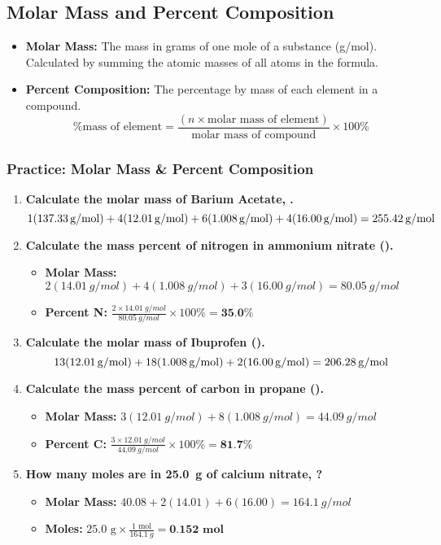 \documentclass{article}
\begin{document}
\subsection*{Molar Mass and Percent Composition}
\begin{itemize}[itemsep=5pt]
    \item \textbf{Molar Mass:} The mass in grams of one mole of a substance (\si{g/mol}). Calculated by summing the atomic masses of all atoms in the formula.
    \item \textbf{Percent Composition:} The percentage by mass of each element in a compound.
    \[ \text{\% mass of element} = \frac{(n \times \text{molar mass of element})}{\text{molar mass of compound}} \times 100\% \]
\end{itemize}

\subsubsection*{Practice: Molar Mass \& Percent Composition}
\begin{enumerate}[itemsep=5pt]
    \item \textbf{Calculate the molar mass of Barium Acetate, .}
    \[ 1(\SI{137.33}{g/mol}) + 4(\SI{12.01}{g/mol}) + 6(\SI{1.008}{g/mol}) + 4(\SI{16.00}{g/mol}) = \textbf{\SI{255.42}{g/mol}} \]
    \item \textbf{Calculate the mass percent of nitrogen in ammonium nitrate ().}
    \begin{itemize}
        \item \textbf{Molar Mass:} \(2(\SI{14.01}{g/mol}) + 4(\SI{1.008}{g/mol}) + 3(\SI{16.00}{g/mol}) = \SI{80.05}{g/mol}\)
        \item \textbf{Percent N:} \( \frac{2 \times \SI{14.01}{g/mol}}{\SI{80.05}{g/mol}} \times 100\% = \textbf{35.0\%} \)
    \end{itemize}
    \item \textbf{Calculate the molar mass of Ibuprofen ().}
     \[ 13(\SI{12.01}{g/mol}) + 18(\SI{1.008}{g/mol}) + 2(\SI{16.00}{g/mol}) = \textbf{\SI{206.28}{g/mol}} \]
    \item \textbf{Calculate the mass percent of carbon in propane ().}
     \begin{itemize}
        \item \textbf{Molar Mass:} \(3(\SI{12.01}{g/mol}) + 8(\SI{1.008}{g/mol}) = \SI{44.09}{g/mol}\)
        \item \textbf{Percent C:} \( \frac{3 \times \SI{12.01}{g/mol}}{\SI{44.09}{g/mol}} \times 100\% = \textbf{81.7\%} \)
    \end{itemize}
    \item \textbf{How many moles are in \SI{25.0}{g} of calcium nitrate, ?}
     \begin{itemize}
        \item \textbf{Molar Mass:} \(40.08 + 2(14.01) + 6(16.00) = \SI{164.1}{g/mol}\)
        \item \textbf{Moles:} \( 25.0 \text{ g} \times \frac{1 \text{ mol}}{\SI{164.1}{g}} = \textbf{0.152 mol} \)
    \end{itemize}
\end{enumerate}
\end{document}
